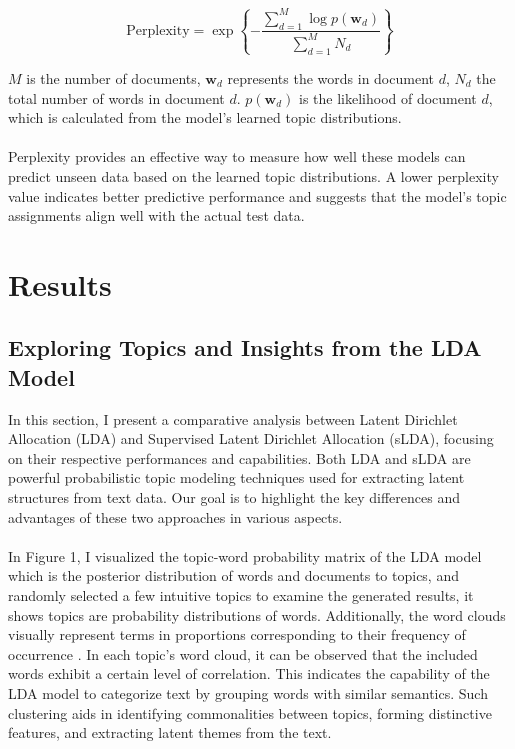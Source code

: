 \documentclass[12pt,twoside]{article}
\begin{document}
\begin{equation}
        \text{Perplexity} = \exp \left\{ -\frac{{\sum_{d=1}^{M} \log p(\mathbf{w}_d)}}{{\sum_{d=1}^{M} N_d}} \right\}
\end{equation}


\(M\) is the number of documents, \(\mathbf{w}_d\) represents the words in document \(d\), \(N_d\) the total number of words in document \(d\). \(p(\mathbf{w}_d)\) is the likelihood of document 
\(d\), which is calculated from the model's learned topic distributions.\\\\

Perplexity provides an effective way to measure how well these models can predict unseen data based on the learned topic distributions. A lower perplexity value indicates better predictive performance and suggests that the model's topic assignments align well with the actual test data.



\section{Results}
\subsection{Exploring Topics and Insights from the LDA Model}
In this section, I present a comparative analysis between Latent Dirichlet Allocation (LDA) and Supervised Latent Dirichlet Allocation (sLDA), focusing on their respective performances and capabilities. Both LDA and sLDA are powerful probabilistic topic modeling techniques used for extracting latent structures from text data. Our goal is to highlight the key differences and advantages of these two approaches in various aspects.\\\\


In Figure 1, I visualized the topic-word probability matrix of the LDA model which is the posterior distribution of words and documents to topics, and randomly selected a few intuitive topics to examine the generated results, it shows topics are probability distributions of words. Additionally, the word clouds visually represent terms in proportions corresponding to their frequency of occurrence \cite{vanAtteveldt2018}. In each topic's word cloud, it can be observed that the included words exhibit a certain level of correlation. This indicates the capability of the LDA model to categorize text by grouping words with similar semantics. Such clustering aids in identifying commonalities between topics, forming distinctive features, and extracting latent themes from the text.\\\\
\end{document}
